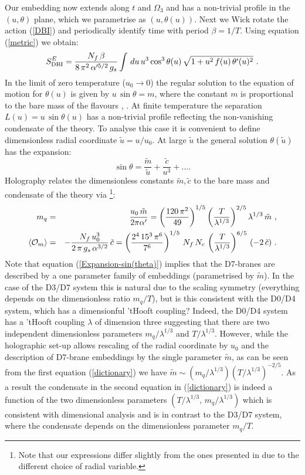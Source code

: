 \documentclass[a4paper]{jpconf}
\begin{document}
Our embedding now extends along $t$ and $\Omega_3$ and has a non-trivial profile in the $(u,\theta)$ plane, which we parametrise as $(u,\theta(u))$. Next we Wick rotate the action (\ref{DBI}) and periodically identify time with period $\beta =1/T$. Using equation (\ref{metric}) we obtain:
%
\begin{equation}\label{DBI-Wick}
S_{\rm DBI}^E =\frac{N_f\,\beta}{8\,\pi^2\,\alpha'^{5/2}\,g_s}\int\, du\,u^3\cos^3\theta(u)\,\sqrt{1+u^2\,f(u)\,\theta'(u)^2}\ .
\end{equation}
%
In the limit of zero temperature ($u_0\to0$) the regular solution to the equation of motion for $\theta(u)$ is given by $u\,\sin\theta = m$, where the constant $m$ is proportional to the bare mass of the flavours \cite{Karch:2002sh}, \cite{Mateos:2007vn}. At finite temperature the separation $L(u)=u\,\sin\theta(u)$ has a non-trivial profile reflecting the non-vanishing condensate of the theory. To analyse this case it is convenient to define dimensionless radial coordinate $\tilde u = u/u_0$. At large $\tilde u$ the general solution $\theta(\tilde u)$ has the expansion: 
%
\begin{equation}\label{Expansion-sin(theta)}
\sin\theta =\frac{\tilde m}{\tilde u}+\frac{\tilde c}{u^3}+\dots.
\end{equation}
%
Holography relates the dimensionless constants $\tilde m, \tilde c$ to the bare mass and condensate of the theory via \cite{Mateos:2007vn}\footnote{Note that our expressions differ slightly from the ones presented in \cite{Mateos:2007vn} due to the different choice of radial variable.}:
%
\begin{eqnarray}
m_q &=& \frac{u_0\,\tilde m}{2\pi\alpha'}=\left(\frac{120\,\pi^2}{49}\right)^{1/5}\left(\frac{T}{\lambda^{1/3}}\right)^{2/5}\lambda^{1/3}\,\tilde m\ , \nonumber \\
\langle {\cal O}_m\rangle &=&-\frac{N_f\,u_0^3}{2\,\pi\,g_s\,\alpha^{3/2}} \,\tilde c=\left(\frac{2^4 \,15^3\,\pi^6}{7^6}\right)^{1/5}\,N_f\,N_c\,\left(\frac{T}{\lambda^{1/3}}\right)^{6/5}\,(-2\,\tilde c)\ .
\label{dictionary}
\end{eqnarray}
%
Note that equation (\ref{Expansion-sin(theta)}) implies that the D7-branes are described by a one parameter family of embeddings (parametrised by $\tilde m$). In the case of the D3/D7 system this is natural due to the scaling symmetry (everything depends on the dimensionless ratio $m_q/T$), but is this consistent with the D0/D4 system, which has a dimensionful 'tHooft coupling? Indeed, the D0/D4 system has a 'tHooft coupling $\lambda$ of dimension three suggesting that there are two independent dimensionless parameters $m_q/\lambda^{1/3}$ and $T/\lambda^{1/3}$.  However, while the holographic set-up allows rescaling of the radial coordinate by $u_0$ and the description of D7-brane embeddings by the single parameter $\tilde m$, as can be seen from the first equation (\ref{dictionary}) we have $\tilde m \sim (m_q/\lambda^{1/3}) (T/\lambda^{1/3})^{-2/5}$. As a result the condensate in the second equation in (\ref{dictionary}) is indeed a function of the two dimensionless parameters $(T/\lambda^{1/3},\, m_q/\lambda^{1/3})$ which is consistent with dimensional analysis and is in contrast to the D3/D7 system, where the condensate depends on the dimensionless parameter $m_q/T$.   
\end{document}
